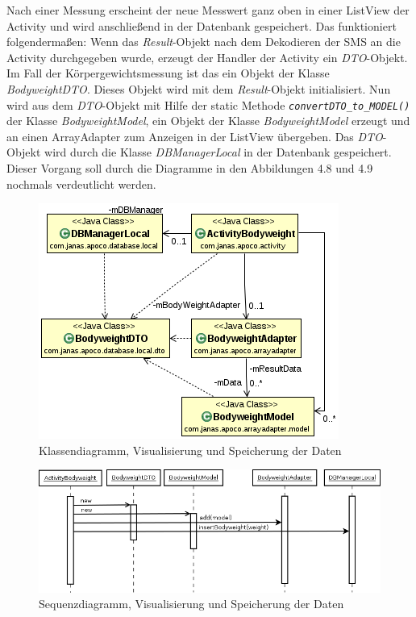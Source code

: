 Nach einer Messung erscheint der neue Messwert ganz oben in einer ListView der Activity und wird anschlie\ss{}end 
in der Datenbank gespeichert.
Das funktioniert folgenderma\ss{}en:
Wenn das \emph{Result}-Objekt nach dem Dekodieren der SMS an die Activity durchgegeben wurde, 
erzeugt der Handler der Activity ein \emph{DTO}-Objekt.
Im Fall der K\"orpergewichtsmessung ist das ein Objekt der Klasse \emph{BodyweightDTO}.
Dieses Objekt wird mit dem \emph{Result}-Objekt initialisiert.
Nun wird aus dem \emph{DTO}-Objekt mit Hilfe der static Methode \emph{\texttt{convertDTO\_to\_MODEL()}} 
der Klasse \emph{BodyweightModel}, ein Objekt
der Klasse \emph{BodyweightModel}  erzeugt und an einen ArrayAdapter zum Anzeigen in der ListView \"ubergeben.
Das \emph{DTO}-Objekt wird durch die Klasse \emph{DBManagerLocal} in der Datenbank gespeichert.
Dieser Vorgang soll durch die Diagramme in den Abbildungen 4.8 und 4.9 nochmals verdeutlicht werden.


\begin{figure}[h]
  \centering
  \includegraphics[scale=0.8]{diagramme/kapitel4/uml/show_results_in_lv.png}
  \caption{Klassendiagramm, Visualisierung und Speicherung der Daten}
  
\end{figure}

\begin{figure}[h]
  \centering
  \includegraphics[scale=0.5]{diagramme/kapitel4/sequenzdiagramme/vl_db.png}
  \caption{Sequenzdiagramm, Visualisierung und Speicherung der Daten}
  
\end{figure}